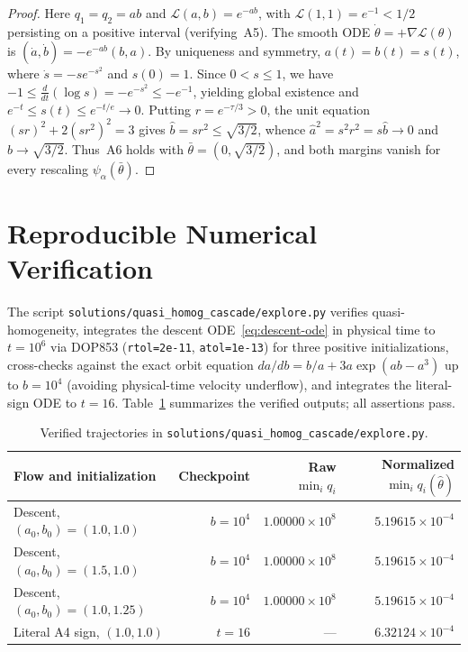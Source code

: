 \documentclass[11pt]{article}
\theoremstyle{plain}
\theoremstyle{definition}
\theoremstyle{remark}
\begin{document}
\begin{proof}
Here $q_1 = q_2 = ab$ and $\mathcal{L}(a, b) = e^{-ab}$, with $\mathcal{L}(1, 1) = e^{-1} < 1/2$ persisting on a positive interval (verifying~A5). The smooth ODE $\dot{\theta} = +\nabla\mathcal{L}(\theta)$ is $(\dot{a}, \dot{b}) = -e^{-ab}(b, a)$. By uniqueness and symmetry, $a(t) = b(t) = s(t)$, where $\dot{s} = -s e^{-s^2}$ and $s(0) = 1$. Since $0 < s \le 1$, we have $-1 \le \frac{d}{dt}(\log s) = -e^{-s^2} \le -e^{-1}$, yielding global existence and $e^{-t} \le s(t) \le e^{-t/e} \to 0$. Putting $r = e^{-\tau/3} > 0$, the unit equation $(sr)^2 + 2(sr^2)^2 = 3$ gives $\hat{b} = sr^2 \le \sqrt{3/2}$, whence $\hat{a}^2 = s^2 r^2 = s\hat{b} \to 0$ and $\hat{b} \to \sqrt{3/2}$. Thus~A6 holds with $\bar{\theta} = (0, \sqrt{3/2})$, and both margins vanish for every rescaling $\psi_\alpha(\bar{\theta})$.
\end{proof}

\section{Reproducible Numerical Verification}

The script \texttt{solutions/quasi\_homog\_cascade/explore.py} verifies quasi-homogeneity, integrates the descent ODE~\eqref{eq:descent-ode} in physical time to $t = 10^6$ via DOP853 (\texttt{rtol=2e-11}, \texttt{atol=1e-13}) for three positive initializations, cross-checks against the exact orbit equation $da/db = b/a + 3a\exp(ab - a^3)$ up to $b = 10^4$ (avoiding physical-time velocity underflow), and integrates the literal-sign ODE to $t = 16$. Table~\ref{tab:cascade} summarizes the verified outputs; all assertions pass.

\begin{table}[htbp]
\centering
\begin{tabular}{@{}lrrr@{}}
\toprule
Flow and initialization & Checkpoint & Raw $\min_i q_i$ & Normalized $\min_i q_i(\hat{\theta})$ \\
\midrule
Descent, $(a_0, b_0) = (1.0, 1.0)$  & $b = 10^4$ & $1.00000 \times 10^8$ & $5.19615 \times 10^{-4}$ \\
Descent, $(a_0, b_0) = (1.5, 1.0)$  & $b = 10^4$ & $1.00000 \times 10^8$ & $5.19615 \times 10^{-4}$ \\
Descent, $(a_0, b_0) = (1.0, 1.25)$ & $b = 10^4$ & $1.00000 \times 10^8$ & $5.19615 \times 10^{-4}$ \\
Literal A4 sign, $(1.0, 1.0)$       & $t = 16$   & ---                   & $6.32124 \times 10^{-4}$ \\
\bottomrule
\end{tabular}
\caption{Verified trajectories in \texttt{solutions/quasi\_homog\_cascade/explore.py}.}\label{tab:cascade}
\end{table}
\end{document}

